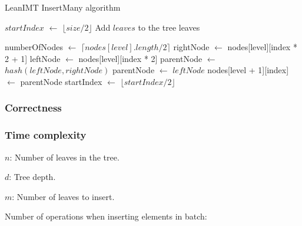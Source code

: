 \documentclass{article}
\begin{document}
\begin{algorithm}[H]
    \caption{LeanIMT InsertMany algorithm}\label{insertMany}
    \begin{algorithmic}[1]
        \State $startIndex$ $\gets$ $\lfloor size/2 \rfloor$ 
        \State Add $leaves$ to the tree leaves

        \State numberOfNodes $\gets$ $\lceil nodes[level].length / 2 \rceil$ 
        \State rightNode $\gets$ nodes[level][index * 2 + 1] 
        \State leftNode $\gets$ nodes[level][index * 2] 
        \State parentNode $\gets$ $hash(leftNode, rightNode)$
        \Else
        \State parentNode $\gets$ $leftNode$
        \EndIf
        \State nodes[level + 1][index] $\gets$ parentNode 
        \EndFor
        \State startIndex $\gets$ $\lfloor startIndex/2 \rfloor$ 
        \EndFor
        \EndProcedure
    \end{algorithmic}
\end{algorithm}

\bigbreak

\subsubsection{Correctness}

\bigbreak

\subsubsection{Time complexity}

$n$: Number of leaves in the tree.

$d$: Tree depth.

$m$: Number of leaves to insert.

\bigbreak

Number of operations when inserting elements in batch:

\bigbreak
\end{document}

